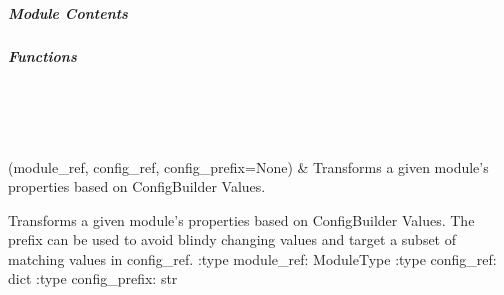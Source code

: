 \documentclass[letterpaper,10pt,english]{sphinxmanual}
\begin{document}
\subparagraph{}
\label{\detokenize{autoapi/pine/backend/shared/transform/index:module-pine.backend.shared.transform}}\label{\detokenize{autoapi/pine/backend/shared/transform/index:pine-backend-shared-transform}}\label{\detokenize{autoapi/pine/backend/shared/transform/index::doc}}

\subparagraph{Module Contents}
\label{\detokenize{autoapi/pine/backend/shared/transform/index:module-contents}}

\subparagraph{Functions}
\label{\detokenize{autoapi/pine/backend/shared/transform/index:functions}}

\begin{savenotes}\sphinxatlongtablestart\begin{longtable}[c]{}
\hline

\endfirsthead

%
{}\\
\hline

\endhead

\hline
{}\\
\endfoot

\endlastfoot

\sphinxAtStartPar
{\hyperref[\detokenize{autoapi/pine/backend/shared/transform/index:pine.backend.shared.transform.transform_module_by_config}]{}}(module\_ref, config\_ref, config\_prefix=None)
&
\sphinxAtStartPar
Transforms a given module’s properties based on ConfigBuilder Values.
\\
\hline
\end{longtable}\sphinxatlongtableend\end{savenotes}

\begin{fulllineitems}
\label{\detokenize{autoapi/pine/backend/shared/transform/index:pine.backend.shared.transform.transform_module_by_config}}
\sphinxAtStartPar
Transforms a given module’s properties based on ConfigBuilder Values.
The prefix can be used to avoid blindy changing values and target a subset of matching values in config\_ref.
:type module\_ref: ModuleType
:type config\_ref: dict
:type config\_prefix: str

\end{fulllineitems}
\end{document}
